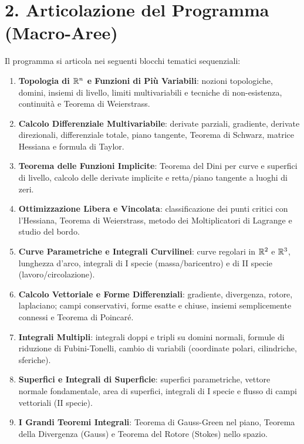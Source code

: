 \documentclass[11pt,a4paper,twoside,openright]{book}
\begin{document}
\section*{2. Articolazione del Programma (Macro-Aree)}
Il programma si articola nei seguenti blocchi tematici sequenziali:
\begin{enumerate}
    \item \textbf{Topologia di $\mathbb{R}^n$ e Funzioni di Più Variabili}: nozioni topologiche, domini, insiemi di livello, limiti multivariabili e tecniche di non-esistenza, continuità e Teorema di Weierstrass.
    \item \textbf{Calcolo Differenziale Multivariabile}: derivate parziali, gradiente, derivate direzionali, differenziale totale, piano tangente, Teorema di Schwarz, matrice Hessiana e formula di Taylor.
    \item \textbf{Teorema delle Funzioni Implicite}: Teorema del Dini per curve e superfici di livello, calcolo delle derivate implicite e retta/piano tangente a luoghi di zeri.
    \item \textbf{Ottimizzazione Libera e Vincolata}: classificazione dei punti critici con l'Hessiana, Teorema di Weierstrass, metodo dei Moltiplicatori di Lagrange e studio del bordo.
    \item \textbf{Curve Parametriche e Integrali Curvilinei}: curve regolari in $\mathbb{R}^2$ e $\mathbb{R}^3$, lunghezza d'arco, integrali di I specie (massa/baricentro) e di II specie (lavoro/circolazione).
    \item \textbf{Calcolo Vettoriale e Forme Differenziali}: gradiente, divergenza, rotore, laplaciano; campi conservativi, forme esatte e chiuse, insiemi semplicemente connessi e Teorema di Poincaré.
    \item \textbf{Integrali Multipli}: integrali doppi e tripli su domini normali, formule di riduzione di Fubini-Tonelli, cambio di variabili (coordinate polari, cilindriche, sferiche).
    \item \textbf{Superfici e Integrali di Superficie}: superfici parametriche, vettore normale fondamentale, area di superfici, integrali di I specie e flusso di campi vettoriali (II specie).
    \item \textbf{I Grandi Teoremi Integrali}: Teorema di Gauss-Green nel piano, Teorema della Divergenza (Gauss) e Teorema del Rotore (Stokes) nello spazio.
\end{enumerate}

\cleardoublepage

\mainmatter











\end{document}

